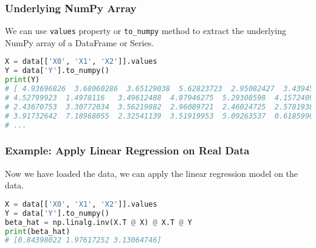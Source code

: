 \documentclass[beamer, en, version=2.0]{huangfusl-template}
\begin{document}
    \begin{frame}[fragile]
        \frametitle{Underlying NumPy Array}

        We can use {\color{blue}\footnotesize\verb|values|} property or {\color{blue}\footnotesize\verb|to_numpy|} method to extract the underlying NumPy array of a DataFrame or Series.

\begin{lstlisting}[language=python]
X = data[['X0', 'X1', 'X2']].values
Y = data['Y'].to_numpy()
print(Y)
# [ 4.93696826  3.68060286  3.65129038  5.62823723  2.95082427  3.43945708
# 4.52799923  1.4978116   3.49612488  4.87946275  5.29308598  4.15724098
# 2.43670753  3.30772034  3.56219882  2.96089721  2.46024725  2.57819384
# 3.91732642  7.18968055  2.32541139  3.51919953  5.09263537  0.61859906
# ...
\end{lstlisting}

    \end{frame}
    \begin{frame}[fragile]
        \frametitle{Example: Apply Linear Regression on Real Data}

        Now we have loaded the data, we can apply the linear regression model on the data.

\begin{lstlisting}[language=python]
X = data[['X0', 'X1', 'X2']].values
Y = data['Y'].to_numpy()
beta_hat = np.linalg.inv(X.T @ X) @ X.T @ Y
print(beta_hat)
# [0.84398022 1.97617252 3.13064746]
\end{lstlisting}
    \end{frame}

    \begin{frame}
        \mythanks
    \end{frame}
\end{document}
